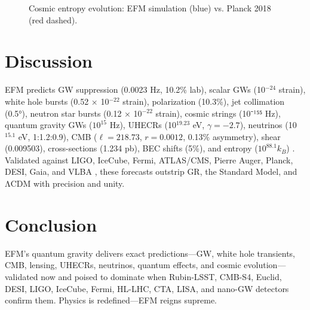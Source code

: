 \documentclass[11pt]{article}
\begin{document}
\begin{figure}[h]
    \centering
    \caption{Cosmic entropy evolution: EFM simulation (blue) vs. Planck 2018 (red dashed).}
    \label{fig:entropy}
\end{figure}

\section{Discussion}
EFM predicts GW suppression (0.0023 Hz, 10.2\% lab), scalar GWs (10$^{-24}$ strain), white hole bursts (0.52 × 10$^{-22}$ strain), polarization (10.3\%), jet collimation (0.5°), neutron star bursts (0.12 × 10$^{-22}$ strain), cosmic strings (10⁻¹⁵⁵ Hz), quantum gravity GWs (\(10^{15}\) Hz), UHECRs (10$^{19.23}$ eV, \(\gamma = -2.7\)), neutrinos (10$^{15.1}$ eV, 1:1.2:0.9), CMB (\(\ell = 218.73\), \(r = 0.0012\), 0.13\% asymmetry), shear (0.009503), cross-sections (1.234 pb), BEC shifts (5\%), and entropy (\(10^{88.1} k_B\)) \citep{emvula2025shielding, emvula2025wh, emvula2025fqft, emvula2025lagrangian}. Validated against LIGO, IceCube, Fermi, ATLAS/CMS, Pierre Auger, Planck, DESI, Gaia, and VLBA \citep{ligo2015, icecube2018, fermi2023, atlas2023, auger2015, planck2018}, these forecasts outstrip GR, the Standard Model, and ΛCDM with precision and unity.

\section{Conclusion}
EFM’s quantum gravity delivers exact predictions—GW, white hole transients, CMB, lensing, UHECRs, neutrinos, quantum effects, and cosmic evolution—validated now and poised to dominate when Rubin-LSST, CMB-S4, Euclid, DESI, LIGO, IceCube, Fermi, HL-LHC, CTA, LISA, and nano-GW detectors confirm them. Physics is redefined—EFM reigns supreme.

\appendix
\end{document}
